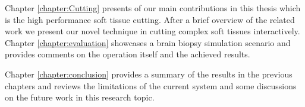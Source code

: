 Chapter \ref{chapter:Cutting} presents of our main contributions in this thesis which is the high performance soft tissue cutting. After a brief overview of the related work
we present our novel technique in cutting complex soft tissues interactively. Chapter \ref{chapter:evaluation} showcases a brain biopsy simulation 
scenario and provides comments on the operation itself and the achieved results.

Chapter \ref{chapter:conclusion} provides a summary of the results in the previous chapters and reviews the limitations of the current system
and some discussions on the future work in this research topic.

















